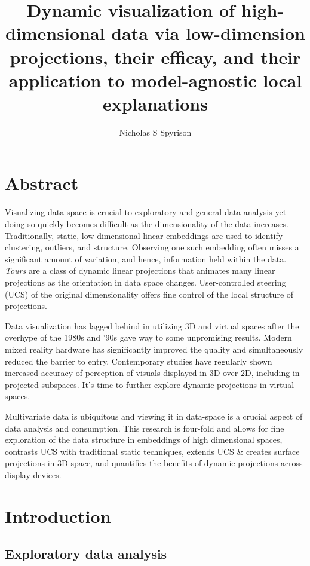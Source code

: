 \documentclass{monashthesis}
\author{Nicholas S Spyrison}
\title{Dynamic visualization of high-dimensional data via low-dimension projections, their efficay, and their application to model-agnostic local explanations}
\begin{document}

\titlepage

{\sf\tighttoc\doublespacing}

\hypertarget{abstract}{%
\chapter*{Abstract}\label{abstract}}

Visualizing data space is crucial to exploratory and general data analysis yet doing so quickly becomes difficult as the dimensionality of the data increases. Traditionally, static, low-dimensional linear embeddings are used to identify clustering, outliers, and structure. Observing one such embedding often misses a significant amount of variation, and hence, information held within the data. \emph{Tours} are a class of dynamic linear projections that animates many linear projections as the orientation in data space changes. User-controlled steering (UCS) of the original dimensionality offers fine control of the local structure of projections.

Data visualization has lagged behind in utilizing 3D and virtual spaces after the overhype of the 1980s and '90s gave way to some unpromising results. Modern mixed reality hardware has significantly improved the quality and simultaneously reduced the barrier to entry. Contemporary studies have regularly shown increased accuracy of perception of visuals displayed in 3D over 2D, including in projected subspaces. It's time to further explore dynamic projections in virtual spaces.

Multivariate data is ubiquitous and viewing it in data-space is a crucial aspect of data analysis and consumption. This research is four-fold and allows for fine exploration of the data structure in embeddings of high dimensional spaces, contrasts UCS with traditional static techniques, extends UCS \& creates surface projections in 3D space, and quantifies the benefits of dynamic projections across display devices.

\clearpage{}\setcounter{page}{0}

\hypertarget{ch:introduction}{%
\chapter{Introduction}\label{ch:introduction}}

\hypertarget{exploratory-data-analysis}{%
\section{Exploratory data analysis}\label{exploratory-data-analysis}}
\end{document}
